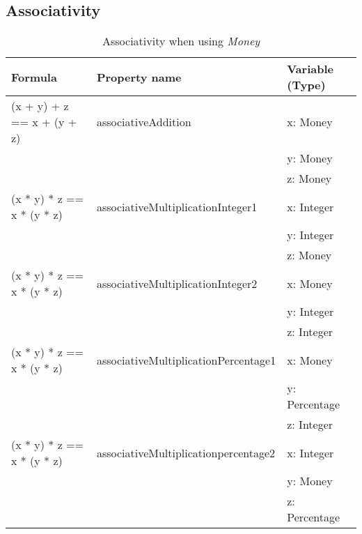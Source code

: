 \subsection*{Associativity}
\label{ssct:properties_associativity}
\begin{table}[!ht]
\centering
\begin{tabular}{lll}
\hline
                        \textbf{Formula}           & \textbf{Property name}               & \textbf{Variable (Type)} \\ \hline
\rowcolor[HTML]{EFEFEF} (x + y) + z == x + (y + z) & associativeAddition                  & x: Money                 \\
\rowcolor[HTML]{EFEFEF}                            &                                      & y: Money                 \\
\rowcolor[HTML]{EFEFEF}                            &                                      & z: Money                 \\
                        (x * y) * z == x * (y * z) & associativeMultiplicationInteger1    & x: Integer               \\
                                                   &                                      & y: Integer               \\
                                                   &                                      & z: Money                 \\
\rowcolor[HTML]{EFEFEF} (x * y) * z == x * (y * z) & associativeMultiplicationInteger2    & x: Money                 \\
\rowcolor[HTML]{EFEFEF}                            &                                      & y: Integer               \\
\rowcolor[HTML]{EFEFEF}                            &                                      & z: Integer               \\
                        (x * y) * z == x * (y * z) & associativeMultiplicationPercentage1 & x: Money                 \\
                                                   &                                      & y: Percentage            \\
                                                   &                                      & z: Integer               \\
\rowcolor[HTML]{EFEFEF} (x * y) * z == x * (y * z) & associativeMultiplicationpercentage2 & x: Integer               \\
\rowcolor[HTML]{EFEFEF}                            &                                      & y: Money                 \\
\rowcolor[HTML]{EFEFEF}                            &                                      & z: Percentage            \\ \hline
\end{tabular}
\caption{Associativity when using \textit{Money}}
\label{tbl:ch4_money_associativity}
\end{table}
